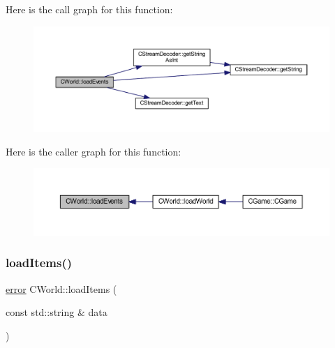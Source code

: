 Here is the call graph for this function\+:\nopagebreak
\begin{figure}[H]
\begin{center}
\leavevmode
\includegraphics[width=350pt]{class_c_world_afa6876cb4b0d0aa9aec88fec6c596634_cgraph}
\end{center}
\end{figure}
Here is the caller graph for this function\+:\nopagebreak
\begin{figure}[H]
\begin{center}
\leavevmode
\includegraphics[width=350pt]{class_c_world_afa6876cb4b0d0aa9aec88fec6c596634_icgraph}
\end{center}
\end{figure}
\mbox{\label{class_c_world_abb7ab3f5626b424ebabbd4aec3b60b5a}} 
\subsubsection{\texorpdfstring{load\+Items()}{loadItems()}}
{\footnotesize\ttfamily \mbox{\hyperlink{_errors_list_8h_af10dacfa214e2575bb2e0ee407c242e0}{error}} C\+World\+::load\+Items (\begin{DoxyParamCaption}\item[{const std\+::string \&}]{data }\end{DoxyParamCaption})\hspace{0.3cm}{\ttfamily [protected]}}

